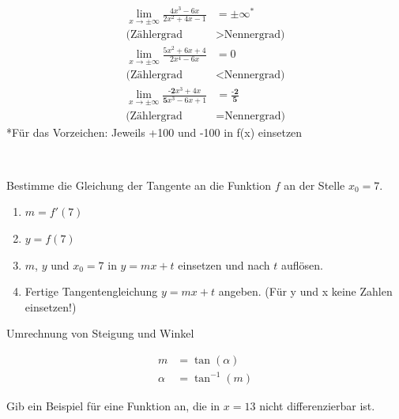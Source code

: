 \documentclass[paper=a6,ngerman,twoside=true,fontsize=14pt, parskip = half]{scrartcl}
\begin{document}
\begin{antwort}
	\begin{align*}
	\lim\limits_{x \rightarrow \pm\infty}{\frac{4x^3 - 6x}{2x^2+4x-1}}&=\pm\infty^* \\
	\text{(Zählergrad } &> \text{Nennergrad)}
	\end{align*}
	\begin{align*}
	\lim\limits_{x \rightarrow \pm\infty}{\frac{5x^2+6x+4}{2x^4-6x}}&=0 \\
	\text{(Zählergrad } &< \text{Nennergrad)}
	\end{align*}
	\begin{align*}
	\lim\limits_{x \rightarrow \pm\infty}{\frac{\textbf{-2}x^3+4x}{\textbf{5}x^3 - 6x+1}}&=\frac{\textbf{-2}}{\textbf{5}} \\
	\text{(Zählergrad } &= \text{Nennergrad)}
	\end{align*}
	\footnotesize 
	*Für das Vorzeichen: Jeweils +100 und -100 in f(x) einsetzen
	~

	~
\end{antwort}
\begin{frage}
	Bestimme die Gleichung der Tangente an die Funktion $f$ an der Stelle \(x_0=7.\)
\end{frage}
\begin{antwort}
	\begin{enumerate}
		\item $m=f'(7)$
		\item $y=f(7)$
		\item $m$, $y$ und $x_0 =7$ in $y= mx+t$ einsetzen und nach $t$ auflösen.
		\item Fertige Tangentengleichung $y= mx+t$ angeben. (Für y und x keine Zahlen einsetzen!)
		
	\end{enumerate}
\end{antwort}
\begin{frage}
	Umrechnung von Steigung und Winkel
\end{frage}
\begin{antwort}
	 \begin{align*}
	 m&=\tan(\alpha) \\
	 \alpha&=\tan^{-1}(m)
	 \end{align*}
\end{antwort}
\begin{frage}
	Gib ein Beispiel für eine Funktion an, die in $x=13$ nicht differenzierbar ist.
\end{frage}
\end{document}
